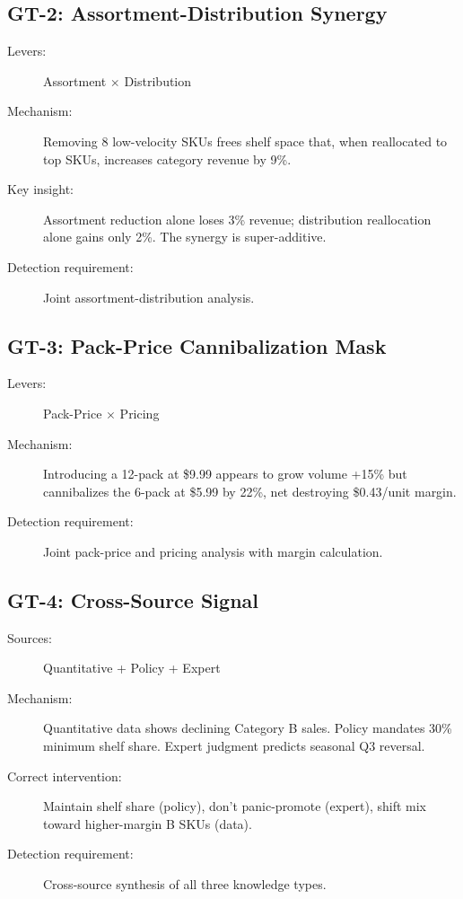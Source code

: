 \documentclass[11pt,a4paper]{article}
\begin{document}
\subsection{GT-2: Assortment-Distribution Synergy}

\begin{description}
    \item[Levers:] Assortment $\times$ Distribution
    \item[Mechanism:] Removing 8 low-velocity SKUs frees shelf space that, when reallocated to top SKUs, increases category revenue by 9\%.
    \item[Key insight:] Assortment reduction alone loses 3\% revenue; distribution reallocation alone gains only 2\%. The synergy is super-additive.
    \item[Detection requirement:] Joint assortment-distribution analysis.
\end{description}

\subsection{GT-3: Pack-Price Cannibalization Mask}

\begin{description}
    \item[Levers:] Pack-Price $\times$ Pricing
    \item[Mechanism:] Introducing a 12-pack at \$9.99 appears to grow volume +15\% but cannibalizes the 6-pack at \$5.99 by 22\%, net destroying \$0.43/unit margin.
    \item[Detection requirement:] Joint pack-price and pricing analysis with margin calculation.
\end{description}

\subsection{GT-4: Cross-Source Signal}

\begin{description}
    \item[Sources:] Quantitative + Policy + Expert
    \item[Mechanism:] Quantitative data shows declining Category B sales. Policy mandates 30\% minimum shelf share. Expert judgment predicts seasonal Q3 reversal.
    \item[Correct intervention:] Maintain shelf share (policy), don't panic-promote (expert), shift mix toward higher-margin B SKUs (data).
    \item[Detection requirement:] Cross-source synthesis of all three knowledge types.
\end{description}
\end{document}
